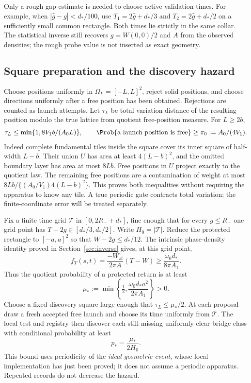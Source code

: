 Only a rough gap estimate is needed to choose active validation times.
For example, when $|\widehat g-g|<d_*/100$, use
$T_1=2\widehat g+d_*/3$ and $T_2=2\widehat g+d_*/2$ on a sufficiently
small common rectangle. Both times lie strictly in the same collar.
The statistical inverse still recovers $g=W(0,0)/2$ and $A$ from the
observed densities; the rough probe value is not inserted as exact geometry.

\subsection{Square preparation and the discovery hazard}
Choose positions uniformly in $\Omega_L=[-L,L]^2$, reject solid positions,
and choose directions uniformly after a free position has been obtained.
Rejections are counted as launch attempts. Let $\tau_L$ be total variation
distance of the resulting position modulo the true lattice from quotient
free-position measure. For $L\ge2b$,
\begin{equation}\label{eq:square}
 \tau_L\le\min\{1,8V_1b/(A_0L)\},\qquad
 \Prob\{\hbox{a launch position is free}\}\ge\pi_0:=A_0/(4V_1).
\end{equation}
Indeed complete fundamental tiles inside the square cover its inner
square of half-width $L-b$. Their union $U$ has area at least
$4(L-b)^2$, and the omitted boundary layer has area at most $8Lb$.
Free positions in $U$ project exactly to the quotient law. The remaining
free positions are a contamination of weight at most
$8Lb/\{(A_0/V_1)4(L-b)^2\}$. This proves both inequalities without
requiring the apparatus to know any tile. A true periodic gate contracts
total variation; the finite-coordinate error will be treated separately.

Fix a finite time grid $\mathcal T$ in $[0,2R_-+d_*]$, fine enough
that for every $g\le R_-$ one grid point has
$T-2g\in[d_*/3,d_*/2]$. Write $H_0=|\mathcal T|$. Reduce the protected
rectangle to $[-a,a]^2$ so that $W-2g\le d_*/12$. The intrinsic
phase-density identity proved in Section~\ref{sec:inverse} gives, at
this grid point,
\[
 f_T(s,t)=\frac{-W_{st}}{2\pi A}(T-W)
                   \ge\frac{\omega_0d_*}{8\pi A_1}.
\]
Thus the quotient probability of a protected return is at least
\begin{equation}\label{eq:mu}
 \mu_*:=\min\left\{\tfrac12,
                         \frac{\omega_0d_*a^2}{2\pi A_1}\right\}>0.
\end{equation}
Choose a fixed discovery square large enough that $\tau_L\le\mu_*/2$.
At each proposal draw a fresh accepted free launch and choose its time
uniformly from $\mathcal T$. The local test and registry then discover
each still missing uniformly clear bridge class with conditional
probability at least
\begin{equation}\label{eq:hazard}
                         p_*=\frac{\mu_*}{2H_0}.
\end{equation}
This bound uses periodicity of the \emph{ideal geometric event}, whose
local implementation has just been proved; it does not assume a periodic
apparatus. Repeated records do not decrease the hazard.

